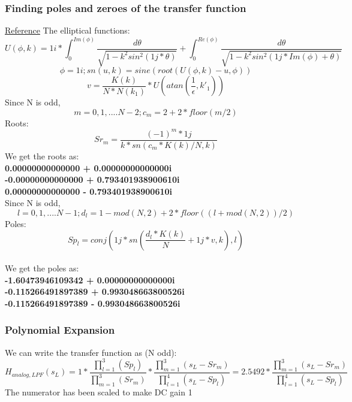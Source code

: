 \documentclass[12pt]{article}
\begin{document}
\subsubsection{Finding poles and zeroes of the transfer function}
\href{https://community.ptc.com/sejnu66972/attachments/sejnu66972/PTCMathcad/176201/1/13.2_Analog_Elliptic_Filter_Design.pdf}{Reference}
The elliptical functions:
\begin{equation}
    U(\phi,k)=1i*\int^{Im(\phi)}_0 \frac{d\theta}{\sqrt{1-k^2sin^2(1j*\theta)}}+\int^{Re(\phi)}_0 \frac{d\theta}{\sqrt{1-k^2sin^2(1j*Im(\phi)+\theta)}}
\end{equation}
\begin{equation}
    \phi=1i ; sn(u,k)=sine(root(U(\phi,k)-u,\phi))
\end{equation}
\begin{equation}
 v=\frac{K(k)}{N*N(k_1)}*U(atan(\frac{1}{\epsilon},k'_1))
\end{equation}
Since N is odd,
\begin{equation}
m=0,1,....N-2; c_m=2+2*floor(m/2)
\end{equation}
Roots:
\begin{equation}
Sr_m=\frac{(-1)^m*1j}{k*sn(c_m*K(k)/N,k)}
\end{equation}
We get the roots as: \textbf{\\0.00000000000000 + 0.00000000000000i
\\-0.00000000000000 + 0.793401938900610i
\\0.00000000000000 - 0.793401938900610i}
\\Since N is odd,
\begin{equation}
l=0,1,....N-1; d_l=1-mod(N,2)+2*floor((l+mod(N,2))/2)
\end{equation}
Poles:
\begin{equation}
Sp_l=conj(1j*sn(\frac{d_l*K(k)}{N}+1j*v,k),l)
\end{equation}
\\We get the poles as: \textbf{\\-1.60473946109342 + 0.00000000000000i
\\-0.115266491897389 + 0.993048663800526i
\\-0.115266491897389 - 0.993048663800526i}

\subsubsection{Polynomial Expansion}
We can write the transfer function as (N odd):
\begin{equation}
    H_{analog,LPF}(s_L) = 1*\frac{\prod_{l=1}^{3}(Sp_l)}{\prod_{m=1}^{3}(Sr_m)}*\frac{\prod_{m=1}^{3}(s_L-Sr_m)}{\prod_{l=1}^{4}(s_L-Sp_l)} = 2.5492*\frac{\prod_{m=1}^{3}(s_L-Sr_m)}{\prod_{l=1}^{4}(s_L-Sp_l)}
\end{equation}
The numerator has been scaled to make DC gain 1
\end{document}
